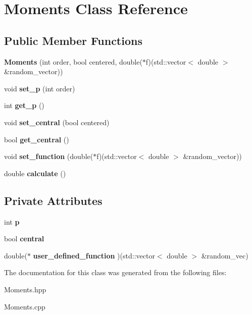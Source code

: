 \hypertarget{class_moments}{}\section{Moments Class Reference}
\label{class_moments}
\subsection*{Public Member Functions}
\begin{DoxyCompactItemize}
\item 
\mbox{\label{class_moments_af8f51e719b3565253eb67a7fd7667502}} 
{\bfseries Moments} (int order, bool centered, double($\ast$f)(std\+::vector$<$ double $>$ \&random\+\_\+vector))
\item 
\mbox{\label{class_moments_a1dbde91cd8e38936ebe0361b71c78967}} 
void {\bfseries set\+\_\+p} (int order)
\item 
\mbox{\label{class_moments_a25155c9efacd719224154c3b69dea863}} 
int {\bfseries get\+\_\+p} ()
\item 
\mbox{\label{class_moments_ac5549fdcf86889e7cfc7527801279486}} 
void {\bfseries set\+\_\+central} (bool centered)
\item 
\mbox{\label{class_moments_a26d12173d77025d2542765d317df3f13}} 
bool {\bfseries get\+\_\+central} ()
\item 
\mbox{\label{class_moments_a054c3ebc912c0510ccb4d80cd3741568}} 
void {\bfseries set\+\_\+function} (double($\ast$f)(std\+::vector$<$ double $>$ \&random\+\_\+vector))
\item 
\mbox{\label{class_moments_af2f6c5757bf3f80b50997e21d386ccf9}} 
double {\bfseries calculate} ()
\end{DoxyCompactItemize}
\subsection*{Private Attributes}
\begin{DoxyCompactItemize}
\item 
\mbox{\label{class_moments_a7024e63f29ef5003294e24ba89af914a}} 
int {\bfseries p}
\item 
\mbox{\label{class_moments_a0653b35a365550a072f171c47627a7a3}} 
bool {\bfseries central}
\item 
\mbox{\label{class_moments_ac6fa678f67e41cba1b7c6d8846e9dd8f}} 
double($\ast$ {\bfseries user\+\_\+defined\+\_\+function} )(std\+::vector$<$ double $>$ \&random\+\_\+vec)
\end{DoxyCompactItemize}


The documentation for this class was generated from the following files\+:\begin{DoxyCompactItemize}
\item 
Moments.\+hpp\item 
Moments.\+cpp\end{DoxyCompactItemize}
